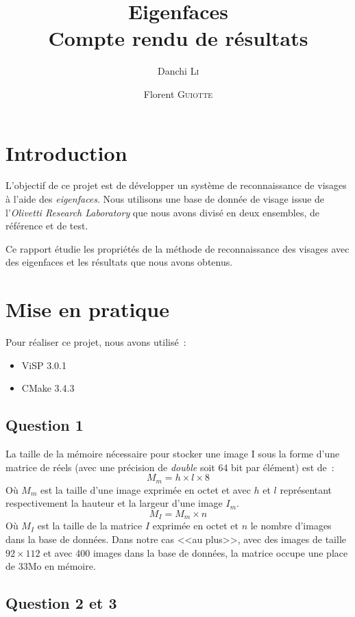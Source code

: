 \documentclass[a4paper]{article}
\author{Danchi \textsc{Li} \and Florent \textsc{Guiotte}}
\title{Eigenfaces \\ \Large{Compte rendu de résultats}}
\begin{document}
\maketitle
\tableofcontents

\section{Introduction}

L'objectif de ce projet est de développer un système de reconnaissance de visages à l'aide des {\em eigenfaces}.
Nous utilisons une base de donnée de visage issue de l'{\em Olivetti Research Laboratory}
que nous avons divisé en deux ensembles, de référence et de test.

Ce rapport étudie les propriétés de la méthode de reconnaissance des visages avec des eigenfaces et les résultats
que nous avons obtenus.

\section{Mise en pratique}

Pour réaliser ce projet, nous avons utilisé~:
\begin{itemize}
    \item ViSP 3.0.1
    \item CMake 3.4.3
\end{itemize}

\subsection{Question 1}

La taille de la mémoire nécessaire pour stocker une image I sous la forme d'une matrice de réels (avec une 
précision de {\em double} soit 64 bit par élément) est de~:
\[
    M_m = h \times l \times 8
\]
Où $M_m$ est la taille d'une image exprimée en octet et avec $h$ et $l$ représentant respectivement la hauteur
et la largeur d'une image $I_m$.
\[
    M_I = M_m \times n
\]
Où $M_I$ est la taille de la matrice $I$ exprimée en octet et $n$ le nombre d'images dans la base de données.
Dans notre cas <<au plus>>, avec des images de taille $92 \times 112$ et avec 400 images dans la base de
données, la matrice occupe une place de 33Mo en mémoire.

\subsection{Question 2 et 3}
\end{document}
